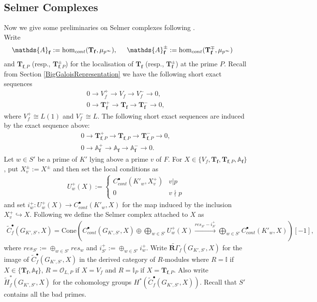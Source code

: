 \documentclass[reqno,10pt]{amsart}
\newcommand{\I}{\mathbb{I}}
\newcommand{\f}{\mathbf{f}}
\newcommand{\T}{\mathbf{T}}
\newcommand{\ip}{\I_P}
\newcommand{\tfp}{\mathbf{T}_{\mathbf{f},P}}
\theoremstyle{plain}
\theoremstyle{definition}
\begin{document}
\subsection{Selmer Complexes}
Now we give some preliminaries on Selmer complexes following \cite{Nekovar}.
\\
Write
\begin{align*}
    \mathds{A}_\f & := \mathrm{hom}_{cont}(\T_\f,\mu_{p^\infty}), \hspace{5mm} \mathds{A}_\f^\pm := \mathrm{hom}_{cont}(\T_\f^\mp,\mu_{p^\infty})
\end{align*}
and $\T_{\f,P}$ (resp., $\T_{\f,P}^\pm$) for the localisation of $\T_\f$ (resp., $\T_\f^\pm$) at the prime $P$.
Recall from Section \ref{BigGaloisRepresentation} we have the following short exact sequences
\begin{align*}
    0 \rightarrow V_f^+ \rightarrow V_f \rightarrow V_f^- \rightarrow 0, \\
    0 \rightarrow \T_\f^+ \rightarrow \T_\f \rightarrow \T_\f^- \rightarrow 0,
\end{align*}
where $V_f^+ \cong L(1)$ and $V_f^- \cong L$. The following short exact sequences are induced by the exact sequence above:
\begin{align*}
    0 \rightarrow \T_{\f,P}^+ \rightarrow \T_{\f,P} \rightarrow \T_{\f,P}^- \rightarrow 0, \\
    0 \rightarrow \mathds{A}_\f^+ \rightarrow \mathds{A}_\f \rightarrow \mathds{A}_\f^- \rightarrow 0.
\end{align*}
Let $w \in S'$ be a prime of $K'$ lying above a prime $v$ of $F$. For $X \in \{V_f,\T_\f,\T_{\f,P}, \mathds{A}_\f \}$, put $X_v^\pm := X^\pm$ and then set the local conditions as 
\begin{align*}
    U_w^+(X) := \begin{cases}
        C^\bullet_{cont}(K'_w,X_v^+) & v|p \\
        0 & v \nmid p
    \end{cases}
\end{align*}
and set $i_w^+ : U_w^+(X) \rightarrow C^\bullet_{cont}(K'_w,X)$ for the map induced by the inclusion $X_v^+ \hookrightarrow X$. Following \cite[Section 6.1]{Nekovar} we define the Selmer complex attached to $X$ as
\begin{align*}
    \widetilde{C}^\bullet_f(G_{K',S'},X) = \text{Cone} \left(C^\bullet_{cont}(G_{K',S'},X) \oplus \bigoplus_{w \in S'} U_w^+(X) \xrightarrow{res_{S'} - i_{S'}^+} \bigoplus_{w \in S'} C^\bullet_{cont}(K'_w,X)\right)[-1],
\end{align*}
where $res_{S'} := \oplus_{w \in S'} res_w$ and $i_{S'}^+ := \oplus_{w \in S'} i_w^+$. Write $\widetilde{\textbf{R}\Gamma}_f(G_{K',S'},X)$ for the image of $\widetilde{C}^\bullet_f(G_{K',S'},X)$ in the derived category of $R$-modules where $R = \I$ if $X \in \{\T_\f, \mathbb{A}_\f\}$, $R = \mathcal{O}_{L,P}$ if $X = V_f$ and $R = \ip$ if $X = \tfp$. Also write $\widetilde{H}^*_f(G_{K',S'},X)$ for the cohomology groups $H^*(\widetilde{C}^\bullet_f(G_{K',S'},X))$. Recall that $S'$ contains all the bad primes.
\end{document}
